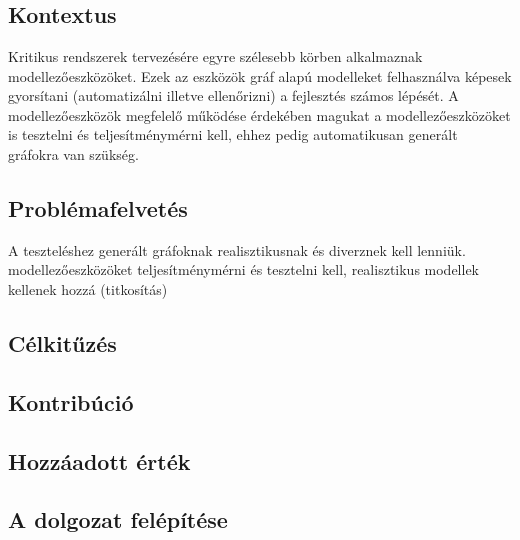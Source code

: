 \chapter{\bevezetes}

\section{Kontextus}
Kritikus rendszerek tervezésére egyre szélesebb körben alkalmaznak modellezőeszközöket.
Ezek az eszközök gráf alapú modelleket felhasználva képesek gyorsítani (automatizálni illetve ellenőrizni) a fejlesztés számos lépését.
A modellezőeszközök megfelelő működése érdekében magukat a modellezőeszközöket is tesztelni és teljesítménymérni kell, ehhez pedig automatikusan generált gráfokra van szükség.

\section{Problémafelvetés}
A teszteléshez generált gráfoknak realisztikusnak és diverznek kell lenniük.
modellezőeszközöket teljesítménymérni és tesztelni kell,
realisztikus modellek kellenek hozzá (titkosítás)

\section{Célkitűzés}

\section{Kontribúció}

\section{Hozzáadott érték}

\section{A dolgozat felépítése}




